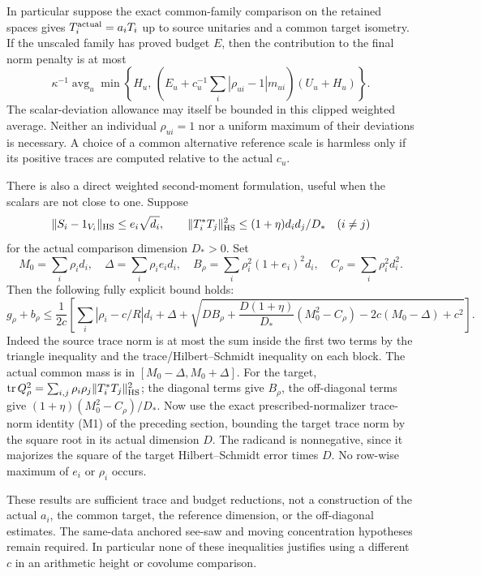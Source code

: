 In particular suppose the exact common-family comparison
on the retained spaces gives \(T_i^{\rm actual}=a_iT_i\)
up to source unitaries and a common target isometry.
If the unscaled family has proved budget \(E\), then
the contribution to the final norm penalty is at most
\[
 \kappa^{-1}\operatorname{avg}_u
 \min\left\{H_u,\,
  \left(E_u+c_u^{-1}\sum_i|\rho_{ui}-1|m_{ui}\right)
                      (U_u+H_u)\right\}.                  \tag{ST2}
\]
The scalar-deviation allowance may itself be bounded in this
clipped weighted average. Neither an individual
\(\rho_{ui}=1\) nor a uniform maximum of their deviations
is necessary. A choice of a common alternative reference
scale is harmless only if its positive traces are computed
relative to the actual \(c_u\).

There is also a direct weighted second-moment formulation,
useful when the scalars are not close to one. Suppose
\[
 \|S_i-1_{V_i}\|_{\rm HS}\le e_i\sqrt{d_i},\qquad
 \|T_i^*T_j\|_{\rm HS}^2\le
          (1+\eta)d_i d_j/D_*\quad(i\ne j)
\]
for the actual comparison dimension \(D_*>0\).
Set
\[
 M_0=\sum_i\rho_i d_i,\quad
 \Delta=\sum_i\rho_i e_i d_i,\quad
 B_\rho=\sum_i\rho_i^2(1+e_i)^2d_i,\quad
 C_\rho=\sum_i\rho_i^2d_i^2 .
\]
Then the following fully explicit bound holds:
\begin{equation}\label{eq:retained-weighted-second-moment}
 g_\rho+b_\rho\le\frac{1}{2c}
 \left[
 \sum_i|\rho_i-c/R|d_i+\Delta+
 \sqrt{D B_\rho+
   \frac{D(1+\eta)}{D_*}(M_0^2-C_\rho)-2c(M_0-\Delta)+c^2}
 \right].
\end{equation}
Indeed the source trace norm is at most the sum inside
the first two terms by the triangle inequality and the
trace/Hilbert--Schmidt inequality on each block.
The actual common mass is in
\([M_0-\Delta,M_0+\Delta]\).
For the target,
\(\operatorname{tr}Q_\rho^2=
\sum_{i,j}\rho_i\rho_j\|T_i^*T_j\|_{\rm HS}^2\);
the diagonal terms give \(B_\rho\), the off-diagonal
terms give \((1+\eta)(M_0^2-C_\rho)/D_*\).
Now use the exact prescribed-normalizer trace-norm identity
(M1) of the preceding section, bounding the target trace
norm by the square root in its actual dimension \(D\).
The radicand is nonnegative, since it majorizes the
square of the target Hilbert--Schmidt error times \(D\).
No row-wise maximum of \(e_i\) or \(\rho_i\) occurs.

These results are sufficient trace and budget reductions,
not a construction of the actual \(a_i\), the common target,
the reference dimension, or the off-diagonal estimates.
The same-data anchored see-saw and moving concentration
hypotheses remain required. In particular none of these
inequalities justifies using a different \(c\) in an
arithmetic height or covolume comparison.

